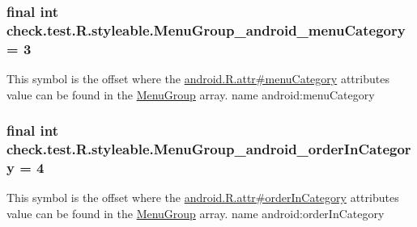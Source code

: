 \subsubsection[{Menu\+Group\+\_\+android\+\_\+menu\+Category}]{\setlength{\rightskip}{0pt plus 5cm}final int check.\+test.\+R.\+styleable.\+Menu\+Group\+\_\+android\+\_\+menu\+Category = 3\hspace{0.3cm}{\ttfamily [static]}}\label{classcheck_1_1test_1_1_r_1_1styleable_ab4abe6642c85e78a9af64e1d520a3856}
This symbol is the offset where the \hyperlink{}{android.\+R.\+attr\#menu\+Category} attribute\textquotesingle{}s value can be found in the \hyperlink{classcheck_1_1test_1_1_r_1_1styleable_a95a67e0fb4cd8754aea3728538c936cf}{Menu\+Group} array.  name android\+:menu\+Category \hypertarget{classcheck_1_1test_1_1_r_1_1styleable_affb54491da972771b15dfc93ab8267f6}{}
\subsubsection[{Menu\+Group\+\_\+android\+\_\+order\+In\+Category}]{\setlength{\rightskip}{0pt plus 5cm}final int check.\+test.\+R.\+styleable.\+Menu\+Group\+\_\+android\+\_\+order\+In\+Category = 4\hspace{0.3cm}{\ttfamily [static]}}\label{classcheck_1_1test_1_1_r_1_1styleable_affb54491da972771b15dfc93ab8267f6}
This symbol is the offset where the \hyperlink{}{android.\+R.\+attr\#order\+In\+Category} attribute\textquotesingle{}s value can be found in the \hyperlink{classcheck_1_1test_1_1_r_1_1styleable_a95a67e0fb4cd8754aea3728538c936cf}{Menu\+Group} array.  name android\+:order\+In\+Category \hypertarget{classcheck_1_1test_1_1_r_1_1styleable_a329149f9ef5c82c8f8ddfde35c9d9e05}{}
